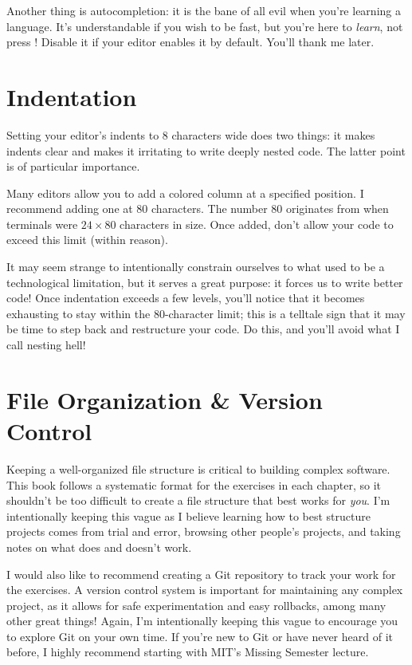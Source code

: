 Another thing is autocompletion: it is the bane of all evil when you're
learning a language.  It's understandable if you wish to be fast, but
you're here to \emph{learn}, not press !  Disable it if your
editor enables it by default.  You'll thank me later.

\section{Indentation}

Setting your editor's indents to 8 characters wide does two things: it
makes indents clear and makes it irritating to write deeply nested code.
The latter point is of particular importance.

Many editors allow you to add a colored column at a specified position.
I recommend adding one at 80 characters.  The number 80 originates from
when terminals were \(24 \times 80\) characters in size.  Once added,
don't allow your code to exceed this limit (within reason).

It may seem strange to intentionally constrain ourselves to what used to
be a technological limitation, but it serves a great purpose: it forces
us to write better code!  Once indentation exceeds a few levels, you'll
notice that it becomes exhausting to stay within the 80-character limit;
this is a telltale sign that it may be time to step back and restructure
your code.  Do this, and you'll avoid what I call nesting hell!

\section{File Organization \& Version Control}

Keeping a well-organized file structure is critical to building complex
software.  This book follows a systematic format for the exercises in
each chapter, so it shouldn't be too difficult to create a file
structure that best works for \emph{you}.  I'm intentionally keeping
this vague as I believe learning how to best structure projects comes
from trial and error, browsing other people's projects, and taking notes
on what does and doesn't work.

I would also like to recommend creating a Git repository to track your work for the exercises.  A
version control system is important for maintaining any complex project,
as it allows for safe experimentation and easy rollbacks, among many
other great things!  Again, I'm intentionally keeping this vague to
encourage you to explore Git on your own time.  If you're new to Git or
have never heard of it before, I highly recommend starting with MIT's
Missing Semester lecture.

